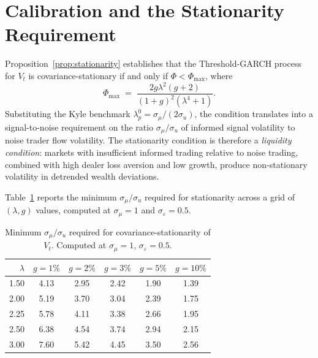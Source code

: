 \documentclass[12pt,a4paper]{article}
\theoremstyle{definition}
\begin{document}
\section{Calibration and the Stationarity Requirement}
\label{sec:calibration}

Proposition~\ref{prop:stationarity} establishes that the Threshold-GARCH
process for $V_t$ is covariance-stationary if and only if $\Phi <
\Phi_{\max}$, where
\begin{equation}
  \Phi_{\max} \;=\; \frac{2g\lambda^2(g+2)}{(1+g)^2(\lambda^4+1)}.
  \label{eq:Phi_max}
\end{equation}
Substituting the Kyle benchmark $\lambda^0_p = \sigma_\mu/(2\sigma_u)$,
the condition translates into a signal-to-noise requirement on the ratio
$\sigma_\mu/\sigma_u$ of informed signal volatility to noise trader flow
volatility. The stationarity condition is therefore a \emph{liquidity
condition}: markets with insufficient informed trading relative to noise
trading, combined with high dealer loss aversion and low growth, produce
non-stationary volatility in detrended wealth deviations.

Table~\ref{tab:calibration} reports the minimum $\sigma_\mu/\sigma_u$
required for stationarity across a grid of $(\lambda, g)$ values, computed
at $\sigma_\mu = 1$ and $\sigma_\varepsilon = 0.5$.

\begin{table}[ht]
\centering
\caption{Minimum $\sigma_\mu/\sigma_u$ required for covariance-stationarity
         of $V_t$. Computed at $\sigma_\mu=1$, $\sigma_\varepsilon=0.5$.}
\label{tab:calibration}
\begin{tabular}{r ccccc}
\toprule
$\lambda$ & $g=1\%$ & $g=2\%$ & $g=3\%$ & $g=5\%$ & $g=10\%$ \\
\midrule
1.50 & 4.13 & 2.95 & 2.42 & 1.90 & 1.39 \\
2.00 & 5.19 & 3.70 & 3.04 & 2.39 & 1.75 \\
2.25 & 5.78 & 4.11 & 3.38 & 2.66 & 1.95 \\
2.50 & 6.38 & 4.54 & 3.74 & 2.94 & 2.15 \\
3.00 & 7.60 & 5.42 & 4.45 & 3.50 & 2.56 \\
\bottomrule
\end{tabular}
\end{table}
\end{document}
